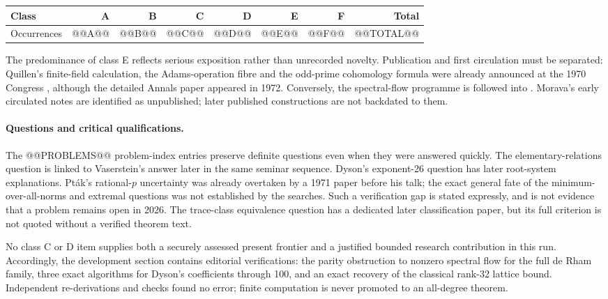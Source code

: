 \begin{center}
\begin{tabular}{lrrrrrrr}
\toprule
Class & A & B & C & D & E & F & Total\\
\midrule
Occurrences & @@A@@ & @@B@@ & @@C@@ & @@D@@ & @@E@@ & @@F@@ & @@TOTAL@@\\
\bottomrule
\end{tabular}
\end{center}

The predominance of class E reflects serious exposition rather than
unrecorded novelty.  Publication and first circulation must be separated:
Quillen's finite-field calculation, the Adams-operation fibre and the
odd-prime cohomology formula were already announced at the 1970 Congress
\citep[\S\S2--3]{quillen1971cohomology}, although the detailed Annals paper
appeared in 1972.  Conversely, the spectral-flow programme is followed into
\citet[\S7]{atiyahpatodisinger1976spectral3}.  Morava's early circulated notes
are identified as unpublished; later published constructions are not
backdated to them.

\paragraph{Questions and critical qualifications.}
The @@PROBLEMS@@ problem-index entries preserve definite questions even when
they were answered quickly.  The elementary-relations question is linked to
Vaserstein's answer later in the same seminar sequence.  Dyson's exponent-26
question has later root-system explanations.  Pt\'ak's rational-\(p\)
uncertainty was already overtaken by a 1971 paper before his talk; the exact
general fate of the minimum-over-all-norms and extremal questions was not
established by the searches.  Such a verification gap is stated expressly,
and is not evidence that a problem remains open in 2026.  The trace-class
equivalence question has a dedicated later classification paper, but its
full criterion is not quoted without a verified theorem text.

No class C or D item supplies both a securely assessed present frontier and
a justified bounded research contribution in this run.  Accordingly, the
development section contains editorial verifications: the parity obstruction
to nonzero spectral flow for the full de Rham family, three exact algorithms
for Dyson's coefficients through 100, and an exact recovery of the classical
rank-32 lattice bound.  Independent re-derivations and checks found no error;
finite computation is never promoted to an all-degree theorem.

